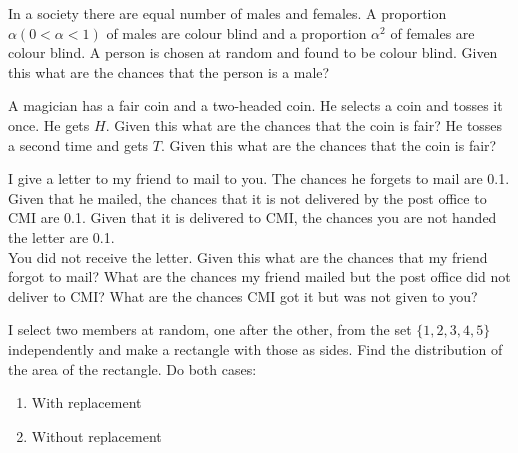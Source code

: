 \documentclass[12pt]{article}
\newenvironment{question}[2][Question]{\begin{trivlist}
\item[\hskip \labelsep {\bfseries #1}\hskip \labelsep {\bfseries #2.}]}{\end{trivlist}}
\begin{document}
\begin{question}{28}
In a society there are equal number of males and females. A proportion $\alpha (0 < \alpha < 1)$ of males are colour blind and a proportion $\alpha^{2}$ of females are colour blind. A person is chosen at random and found to be colour blind. Given this what are the chances that the person is a male?
\end{question}

\begin{question}{29}
A magician has a fair coin and a two-headed coin. He selects a coin and tosses it once. He gets $H$. Given this what are the chances that the coin is fair? He tosses a second time and gets $T$. Given this what are the chances that the coin is fair?
\end{question}

\begin{question}{30}
I give a letter to my friend to mail to you. The chances he forgets to mail are 0.1. Given that he mailed, the chances that it is not delivered by the post office to CMI are 0.1. Given that it is delivered to CMI, the chances you are not handed the letter are 0.1.\\
You did not receive the letter. Given this what are the chances that my friend forgot to mail? What are the chances my friend mailed but the post office did not deliver to CMI? What are the chances CMI got it but was not given to you?
\end{question}

\begin{question}{31}
I select two members at random, one after the other, from the set $\{1,2,3,4,5\}$ independently and make a rectangle with those as sides. Find the distribution of the area of the rectangle. Do both cases:
\begin{enumerate}
\item With replacement
\item Without replacement
\end{enumerate}
\end{question}
\end{document}
